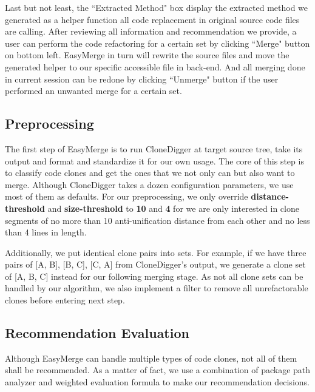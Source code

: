 \documentclass{acm_proc_article-sp}
\begin{document}
Last but not least, the ``Extracted Method" box display the extracted method we generated as a helper function all code replacement 
in original source code files are calling. After reviewing all information and recommendation we provide, a user can perform the code refactoring for
a certain set by clicking ``Merge" button on bottom left. 
EasyMerge in turn will rewrite the source files and move the generated helper to our specific accessible file in back-end.
And all merging done in current session can be redone by clicking ``Unmerge" button if
the user performed an unwanted merge for a certain set.

\subsection{Preprocessing}
The first step of EasyMerge is to run CloneDigger at target source tree, take its output and format and standardize it for our own usage.
The core of this step is to classify code clones and get the ones that we not only can but also want to merge. Although CloneDigger takes
a dozen configuration parameters, we use most of them as defaults. For our preprocessing, we only override {\bf distance-threshold} and {\bf size-threshold}
to {\bf 10} and {\bf 4} for we are only interested in clone segments of no more than 10 anti-unification distance from each other and no less than 4 lines in length.

Additionally, we put identical clone pairs into sets. For example, if we have three pairs of [A, B], [B, C], [C, A] from CloneDigger's output, we generate a clone set
of [A, B, C] instead for our following merging stage. As not all clone sets can be handled by our algorithm, we also implement a filter to remove all unrefactorable
clones before entering next step.

\subsection{Recommendation Evaluation}
Although EasyMerge can handle multiple types of code clones, not all of them shall be recommended. As a matter of fact, we use a combination of 
package path analyzer and weighted evaluation formula to make our recommendation decisions.
\end{document}
